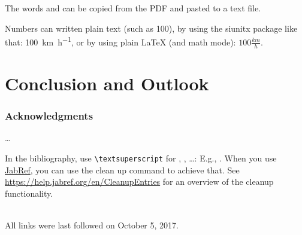 \documentclass[english,runningheads,a4paper]{llncs}[2018/03/10]
\begin{document}
The words  and  can be copied from the PDF and pasted to a text file.

Numbers can written plain text (such as 100), by using the siunitx package like that:
\SI{100}{\km\per\hour},
or by using plain \LaTeX{} (and math mode):
$100 \frac{\mathit{km}}{h}$.

\section{Conclusion and Outlook}
\label{sec:outlook}
\lipsum[1-2]

\subsubsection*{Acknowledgments}
\ldots

In the bibliography, use \texttt{\textbackslash textsuperscript} for , , \ldots:
E.g., .
When you use \href{https://www.jabref.org}{JabRef}, you can use the clean up command to achieve that.
See \url{https://help.jabref.org/en/CleanupEntries} for an overview of the cleanup functionality.


\renewcommand{\bibsection}{\section*{References}} %

\begingroup
  \ifluatex
  \else
  \fi
  \small %
  
\endgroup

\ \\
%
All links were last followed on October 5, 2017.
\end{document}
